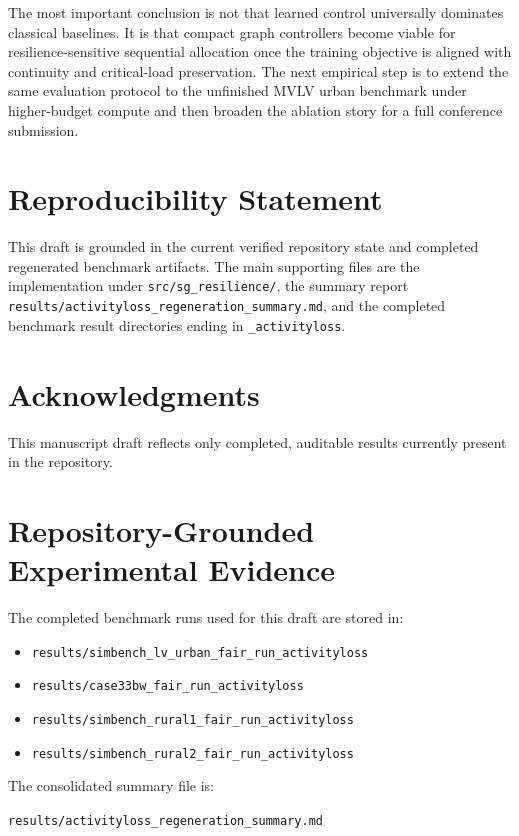 \documentclass[11pt]{article}
\begin{document}
The most important conclusion is not that learned control universally dominates classical baselines. It is that compact graph controllers become viable for resilience-sensitive sequential allocation once the training objective is aligned with continuity and critical-load preservation. The next empirical step is to extend the same evaluation protocol to the unfinished MVLV urban benchmark under higher-budget compute and then broaden the ablation story for a full conference submission.

\section*{Reproducibility Statement}

This draft is grounded in the current verified repository state and completed regenerated benchmark artifacts. The main supporting files are the implementation under \texttt{src/sg\_resilience/}, the summary report \texttt{results/activityloss\_regeneration\_summary.md}, and the completed benchmark result directories ending in \texttt{\_activityloss}.

\section*{Acknowledgments}

This manuscript draft reflects only completed, auditable results currently present in the repository.

\appendix

\section{Repository-Grounded Experimental Evidence}

The completed benchmark runs used for this draft are stored in:
\begin{itemize}[leftmargin=1.5em]
  \item \texttt{results/simbench\_lv\_urban\_fair\_run\_activityloss}
  \item \texttt{results/case33bw\_fair\_run\_activityloss}
  \item \texttt{results/simbench\_rural1\_fair\_run\_activityloss}
  \item \texttt{results/simbench\_rural2\_fair\_run\_activityloss}
\end{itemize}

The consolidated summary file is:
\begin{center}
\texttt{results/activityloss\_regeneration\_summary.md}
\end{center}
\end{document}
